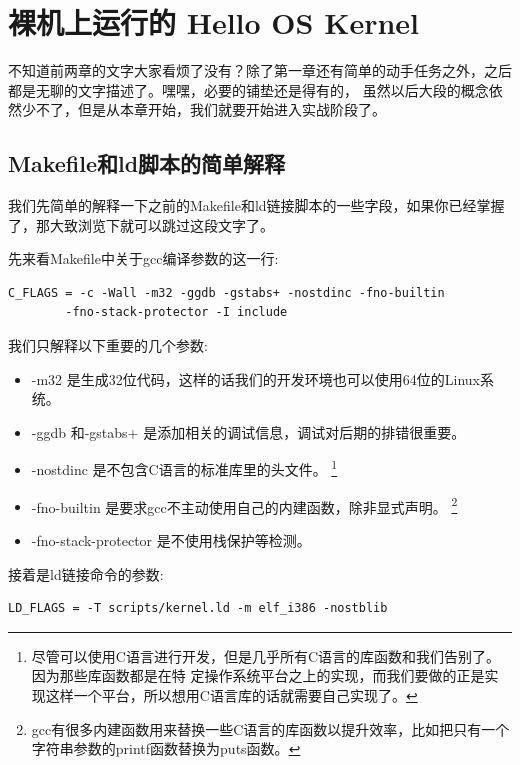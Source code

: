 
\section{裸机上运行的 Hello OS Kernel}

\par 不知道前两章的文字大家看烦了没有？除了第一章还有简单的动手任务之外，之后都是无聊的文字描述了。嘿嘿，必要的铺垫还是得有的，\allowbreak
虽然以后大段的概念依然少不了，但是从本章开始，我们就要开始进入实战阶段了。

\subsection{Makefile和ld脚本的简单解释}

\par 我们先简单的解释一下之前的Makefile和ld链接脚本的一些字段，如果你已经掌握了，那大致浏览下就可以跳过这段文字了。

\par 先来看Makefile中关于gcc编译参数的这一行:

\begin{Verbatim}[frame=single]
  C_FLAGS = -c -Wall -m32 -ggdb -gstabs+ -nostdinc -fno-builtin
		-fno-stack-protector -I include
\end{Verbatim}

\par 我们只解释以下重要的几个参数:
\begin{itemize}
	\item -m32 是生成32位代码，这样的话我们的开发环境也可以使用64位的Linux系统。
	\item -ggdb 和-gstabs+ 是添加相关的调试信息，调试对后期的排错很重要。
	\item -nostdinc 是不包含C语言的标准库里的头文件。\allowbreak
		\footnote{尽管可以使用C语言进行开发，但是几乎所有C语言的库函数和我们告别了。因为那些库函数都是在特\allowbreak
		定操作系统平台之上的实现，而我们要做的正是实现这样一个平台，所以想用C语言库的话就需要自己实现了。}
	\item -fno-builtin 是要求gcc不主动使用自己的内建函数，除非显式声明。
		\footnote{gcc有很多内建函数用来替换一些C语言的库函数以提升效率，比如把只有一个字符串参数的printf函数替换为puts函数。}
	\item -fno-stack-protector 是不使用栈保护等检测。
\end{itemize}

\par 接着是ld链接命令的参数:
\begin{Verbatim}[frame=single]
  LD_FLAGS = -T scripts/kernel.ld -m elf_i386 -nostblib
\end{Verbatim}


